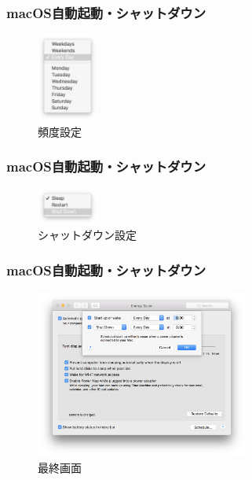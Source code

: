 \documentclass[10pt, dvipdfmx]{beamer}
\begin{document}
        \begin{frame}
            \frametitle{macOS自動起動・シャットダウン}
                \begin{figure}[htb]
                    \includegraphics[width=20mm]{images/auto-4.png}
                    \caption{頻度設定}
                    \label{fig:04}
                \end{figure}
        \end{frame}

        \begin{frame}
            \frametitle{macOS自動起動・シャットダウン}
                \begin{figure}[htb]
                    \includegraphics[width=20mm]{images/auto-5.png}
                    \caption{シャットダウン設定}
                    \label{fig:05}
                \end{figure}
        \end{frame}

        \begin{frame}
            \frametitle{macOS自動起動・シャットダウン}
                \begin{figure}[htb]
                    \includegraphics[width=70mm]{images/auto-6.png}
                    \caption{最終画面}
                    \label{fig:06}
                \end{figure}
        \end{frame}
\end{document}
